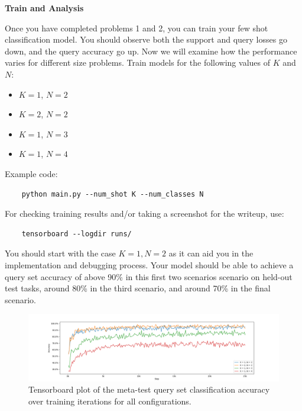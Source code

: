 \item {}  {\bf Train and Analysis}

Once you have completed problems 1 and 2, you can train your few shot classification model. You should observe both the support and query losses go down, and the query accuracy go up. Now we will examine how the performance varies for different size problems.
Train models for the following values of $K$ and $N$:
\begin{itemize}
    \item $K = 1$, $N=2$ %
    \item $K = 2$, $N=2$ %
    \item $K = 1$, $N=3$ %
    \item $K = 1$, $N=4$ %
\end{itemize}

Example code:
\begin{verbatim}
    python main.py --num_shot K --num_classes N
\end{verbatim}  

For checking training results and/or taking a screenshot for the writeup, use:
\begin{verbatim}
    tensorboard --logdir runs/
\end{verbatim}

You should start with the case $K=1 , N=2$ as it can aid you in the implementation and debugging process. Your model should be able to achieve a query set accuracy of above 90\% in this first two scenarios scenario on held-out test tasks, around 80\% in the third scenario, and around 70\% in the final scenario.

\begin{figure}
    \centering
    \includegraphics[width=\linewidth]{./figures/accuracy.png}
    \vspace{-5mm}
    \caption{Tensorboard plot of the meta-test query set classification accuracy over training iterations for all configurations.}
    \label{accuracy}
\end{figure}


